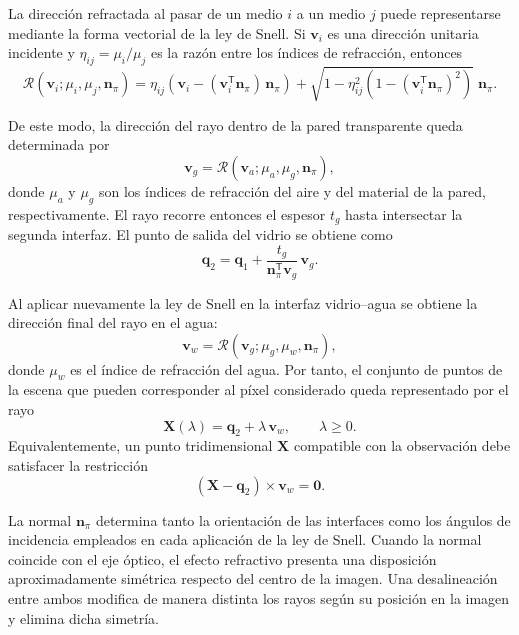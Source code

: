 \documentclass{report}
\begin{document}
La dirección refractada al pasar de un medio $i$ a un medio $j$ puede representarse mediante la forma vectorial de la ley de Snell. Si $\mathbf{v}_i$ es una dirección unitaria incidente y $\eta_{ij} = \mu_i/\mu_j$ es la razón entre los índices de refracción, entonces
\begin{equation}
\mathcal{R}(\mathbf{v}_i; \mu_i, \mu_j, \mathbf{n}_\pi) = \eta_{ij}\left(\mathbf{v}_i - (\mathbf{v}_i^{\mathsf{T}}\mathbf{n}_\pi)\,\mathbf{n}_\pi\right) + \sqrt{1 - \eta_{ij}^2\left(1 - (\mathbf{v}_i^{\mathsf{T}}\mathbf{n}_\pi)^2\right)}\;\mathbf{n}_\pi .
\label{eq:snell-vec}
\end{equation}

De este modo, la dirección del rayo dentro de la pared transparente queda determinada por
\begin{equation}
\mathbf{v}_g = \mathcal{R}(\mathbf{v}_a; \mu_a, \mu_g, \mathbf{n}_\pi),
\label{eq:vg}
\end{equation}
donde $\mu_a$ y $\mu_g$ son los índices de refracción del aire y del material de la pared, respectivamente. El rayo recorre entonces el espesor $t_g$ hasta intersectar la segunda interfaz. El punto de salida del vidrio se obtiene como
\begin{equation}
\mathbf{q}_2 = \mathbf{q}_1 + \frac{t_g}{\mathbf{n}_\pi^{\mathsf{T}}\mathbf{v}_g}\,\mathbf{v}_g .
\label{eq:q2}
\end{equation}

Al aplicar nuevamente la ley de Snell en la interfaz vidrio--agua se obtiene la dirección final del rayo en el agua:
\begin{equation}
\mathbf{v}_w = \mathcal{R}(\mathbf{v}_g; \mu_g, \mu_w, \mathbf{n}_\pi),
\label{eq:vw}
\end{equation}
donde $\mu_w$ es el índice de refracción del agua. Por tanto, el conjunto de puntos de la escena que pueden corresponder al píxel considerado queda representado por el rayo
\begin{equation}
\mathbf{X}(\lambda) = \mathbf{q}_2 + \lambda\,\mathbf{v}_w, \qquad \lambda \geq 0 .
\label{eq:rayo}
\end{equation}
Equivalentemente, un punto tridimensional $\mathbf{X}$ compatible con la observación debe satisfacer la restricción
\begin{equation}
(\mathbf{X} - \mathbf{q}_2) \times \mathbf{v}_w = \mathbf{0}.
\label{eq:restriccion}
\end{equation}

La normal $\mathbf{n}_\pi$ determina tanto la orientación de las interfaces como los ángulos de incidencia empleados en cada aplicación de la ley de Snell. Cuando la normal coincide con el eje óptico, el efecto refractivo presenta una disposición aproximadamente simétrica respecto del centro de la imagen. Una desalineación entre ambos modifica de manera distinta los rayos según su posición en la imagen y elimina dicha simetría.
\end{document}
